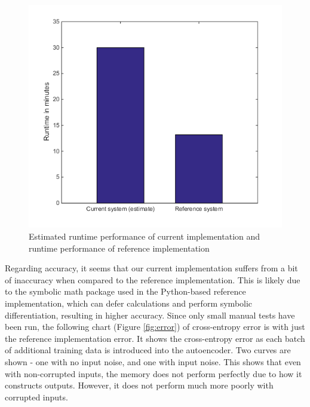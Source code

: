 \documentclass{sig-alternate}
\begin{document}
\begin{figure}[h]
	\begin{center}
		\includegraphics[width=1\linewidth]{performance.png}
	\end{center}
	\vspace{-12pt}
	\caption{Estimated runtime performance of current implementation and runtime performance of reference implementation}
	\label{fig:performance}
\end{figure}

Regarding accuracy, it seems that our current implementation suffers from a bit of inaccuracy
when compared to the reference implementation. This is likely due to the symbolic math
package used in the Python-based reference implementation, which can defer calculations
and perform symbolic differentiation, resulting in higher accuracy. Since only
small manual tests have been run, the following chart (Figure \ref{fig:error}) of cross-entropy error is with just the
reference implementation error. It shows the cross-entropy error as each batch of additional
training data is introduced into the autoencoder. Two curves are shown - one with no input noise, 
and one with input noise. This shows that even with non-corrupted inputs, the memory does not perform
perfectly due to how it constructs outputs. However, it does not perform much more poorly with 
corrupted inputs. 
\end{document}
